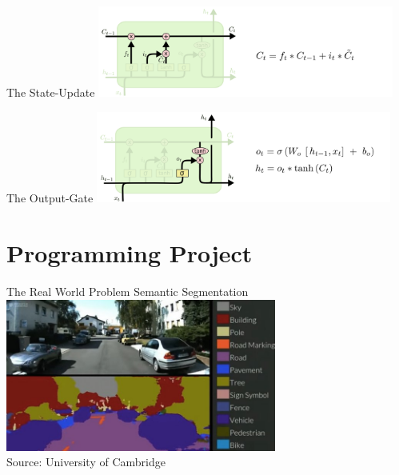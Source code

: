 \begin{frame}{The State-Update}
\includegraphics[height=3.0cm]{data/LSTM3-focus-C.png}\\ 
\end{frame}

\begin{frame}{The Output-Gate}
\includegraphics[height=3.0cm]{data/LSTM3-focus-o.png}\\ 
\end{frame}

\section{Programming Project}
\begin{frame}
\sectionpage
\end{frame}

\begin{frame}{The Real World Problem}
Semantic Segmentation\\
\includegraphics[height=5.0cm]{data/segnet.jpg}\\ 
Source: University of Cambridge\\
\end{frame}

